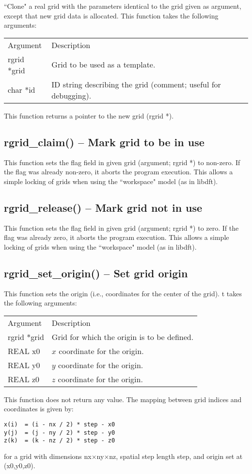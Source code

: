 \documentclass[12pt,letterpaper]{report}
\begin{document}
``Clone" a real grid with the parameters identical to the grid given as argument,  except that new grid data is allocated. This function takes the following arguments:
\begin{longtable}{p{} p{}}
Argument & Description\\
\cline{1-2}
rgrid *grid & Grid to be used as a template.\\
char *id & ID string describing the grid (comment; useful for debugging).\\
\end{longtable}
\noindent
This function returns a pointer to the new grid (rgrid *).

\subsection{rgrid\_claim() -- Mark grid to be in use}

This function sets the flag field in given grid (argument; rgrid *) to non-zero. If the flag was already non-zero, it aborts the program execution. This allows a simple locking of grids when using the ``workspace" model (as in libdft).

\subsection{rgrid\_release() -- Mark grid not in use}

This function sets the flag field in given grid (argument; rgrid *) to zero. If the flag was already zero, it aborts the program execution. This allows a simple locking of grids when using the ``workspace" model (as in libdft).

\subsection{rgrid\_set\_origin() -- Set grid origin}

This function sets the origin (i.e., coordinates for the center of the grid). t takes the following arguments:
\begin{longtable}{p{} p{}}
Argument & Description\\
\cline{1-2}
rgrid *grid & Grid for which the origin is to be defined.\\
REAL x0 & $x$ coordinate for the origin.\\
REAL y0 & $y$ coordinate for the origin.\\
REAL z0 & $z$ coordinate for the origin.\\
\end{longtable}
\noindent
This function does not return any value. The mapping between grid indices and coordinates is given by:
\begin{verbatim}
x(i)  = (i - nx / 2) * step - x0
y(j)  = (j - ny / 2) * step - y0
z(k)  = (k - nz / 2) * step - z0
\end{verbatim}
for a grid with dimensions nx$\times$ny$\times$nz, spatial step length step, and origin set at (x0,y0,z0).
\end{document}
